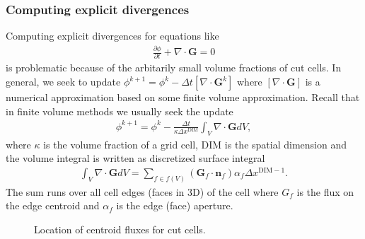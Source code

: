 \documentclass[letterpaper,10pt,english]{sphinxmanual}
\let\sphinxpxdimen\pdfpxdimen\else\newdimen\sphinxpxdimen
\begin{document}
\subsubsection{Computing explicit divergences}
\label{\detokenize{CDR:computing-explicit-divergences}}\label{\detokenize{CDR:chap-explicitdivergence}}
Computing explicit divergences for equations like
\begin{equation*}
\begin{split}\frac{\partial \phi}{\partial t} + \nabla\cdot\mathbf{G} = 0\end{split}
\end{equation*}
is problematic because of the arbitarily small volume fractions of cut cells.
In general, we seek to update \(\phi^{k+1} = \phi^k - \Delta t \left[\nabla\cdot \mathbf{G}^k\right]\) where \(\left[\nabla\cdot\mathbf{G}\right]\) is a numerical approximation based on some finite volume approximation.
Recall that in finite volume methods we usually seek the update
\begin{equation}\label{equation:CDR:conservativeUpdate}
\begin{split}\phi^{k+1} = \phi^k - \frac{\Delta t}{\kappa \Delta x^{\textrm{DIM}}}\int_V\nabla\cdot\mathbf{G}dV,\end{split}
\end{equation}
where \(\kappa\) is the volume fraction of a grid cell, \(\textrm{DIM}\) is the spatial dimension and the volume integral is written as discretized surface integral
\begin{equation*}
\begin{split}\int_V\nabla\cdot\mathbf{G}dV =\sum_{f\in f(V)}\left(\mathbf{G}_f\cdot \mathbf{n}_f\right)\alpha_f\Delta x^{\textrm{DIM} -1}.\end{split}
\end{equation*}
The sum runs over all cell edges (faces in 3D) of the cell where \(G_f\) is the flux on the edge centroid and \(\alpha_f\) is the edge (face) aperture.

\begin{figure}[htb]
\centering
\capstart

\noindent\sphinxincludegraphics[width=480\sphinxpxdimen]{{cutCell}.png}
\caption{Location of centroid fluxes for cut cells.}\label{\detokenize{CDR:id1}}\end{figure}
\end{document}
